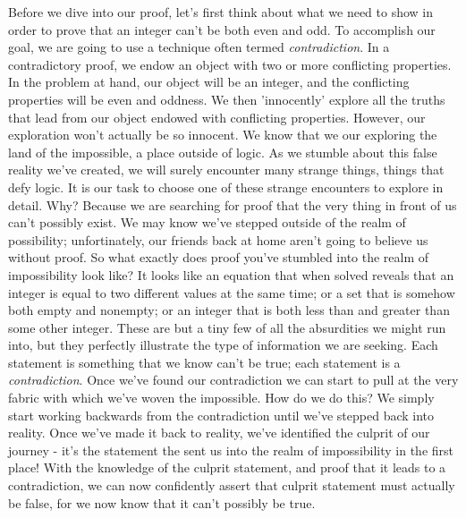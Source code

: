 \documentclass[a4paper,12pt]{article}
\begin{document}
Before we dive into our proof, let's first think about what we need to show in order to prove that an integer can't be both even and odd. To accomplish our goal, we are going to use a technique often termed \textit{contradiction}. In a contradictory proof, we endow an object with two or more conflicting properties. In the problem at hand, our object will be an integer, and the conflicting properties will be even and oddness. We then 'innocently' explore all the truths that lead from our object endowed with conflicting properties. However, our exploration won't actually be so innocent. We know that we our exploring the land of the impossible, a place outside of logic. As we stumble about this false reality we've created, we will surely encounter many strange things, things that defy logic. It is our task to choose one of these strange encounters to explore in detail. Why? Because we are searching for proof that the very thing in front of us can't possibly exist. We may know we've stepped outside of the realm of possibility; unfortinately, our friends back at home aren't going to believe us without proof. So what exactly does proof you've stumbled into the realm of impossibility look like? It looks like an equation that when solved reveals that an integer is equal to two different values at the same time; or a set that is somehow both empty and nonempty; or an integer that is both less than and greater than some other integer. These are but a tiny few of all the absurdities we might run into, but they perfectly illustrate the type of information we are seeking. Each statement is something that we know can't be true; each statement is a \textit{contradiction}. Once we've found our contradiction we can start to pull at the very fabric with which we've woven the impossible. How do we do this? We simply start working backwards from the contradiction until we've stepped back into reality. Once we've made it back to reality, we've identified the culprit of our journey - it's the statement the sent us into the realm of impossibility in the first place! With the knowledge of the culprit statement, and proof that it leads to a contradiction, we can now confidently assert that culprit statement must actually be false, for we now know that it can't possibly be true. 
\end{document}
